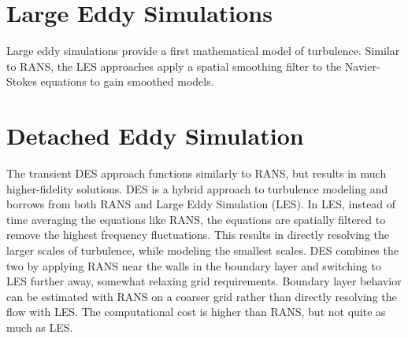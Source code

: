 \documentclass[book.tex]{subfiles}
\begin{document}

\section{Large Eddy Simulations}

Large eddy simulations provide a first mathematical model of turbulence. Similar to RANS, the LES approaches apply a spatial smoothing filter to the Navier-Stokes equations to gain smoothed models. 
\section{Detached Eddy Simulation}

The transient DES approach functions similarly to RANS, but results in much higher-fidelity solutions. DES is a hybrid approach to turbulence modeling and borrows from both RANS and Large Eddy Simulation (LES). In LES, instead of time averaging the equations like RANS, the equations are spatially filtered to remove the highest frequency fluctuations. This results in directly resolving the larger scales of turbulence, while modeling the smallest scales. DES combines the two by applying RANS near the walls in the boundary layer and switching to LES further away, somewhat relaxing grid requirements. Boundary layer behavior can be estimated with RANS on a coarser grid rather than directly resolving the flow with LES. The computational cost is higher than RANS, but not quite as much as LES\cite{lectures}. 

\end{document}

